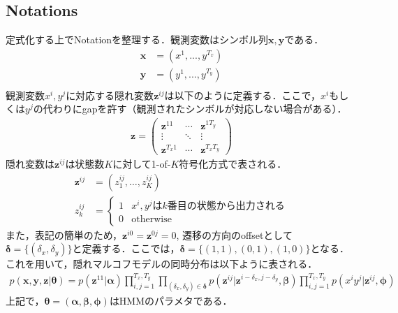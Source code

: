\subsection{Notations}
\label{subsec:phmm_nt}
定式化する上でNotationを整理する．観測変数はシンボル列$\bm{x}, \bm{y}$である．
\begin{align}
\bm{x}&=(x^1,...,y^{T_x})\\
\bm{y}&=(y^1,...,y^{T_y})\\
\end{align}
観測変数$x^i, y^j$に対応する隠れ変数$\bm{z}^{ij}$は以下のように定義する．ここで，$x^i$もしくは$y^j$の代わりにgapを許す（観測されたシンボルが対応しない場合がある）．
\begin{align}
\bm{z} = 
\begin{pmatrix}
\bm{z}^{11}  & \cdots & \bm{z}^{1 T_y} \\
\vdots  & \ddots & \vdots \\
\bm{z}^{T_x 1}& \cdots & \bm{z}^{T_x T_y}
\end{pmatrix}
\end{align}
隠れ変数は$\bm{z}^{ij}$は状態数$K$に対して1-of-$K$符号化方式で表される．
\begin{align}
\bm{z}^{ij} &= (z^{ij}_1,\ldots,z_K^{ij})\\
z_k^{ij} &= \left\{
\begin{array}{ll}
1 & \mbox{$x^i, y^j$は$k$番目の状態から出力される}\\
0 & \mbox{otherwise}
\end{array}
\right.
\end{align}
また，表記の簡単のため，$\bm{z}^{i0}=\bm{z}^{0j}=0$, 遷移の方向のoffsetとして$\bm{\delta}=\{(\delta_x, \delta_y)\}$と定義する．ここでは，$\bm{\delta}=\{(1,1),(0,1),(1,0)\}$となる．
これを用いて，隠れマルコフモデルの同時分布は以下ように表される．
\begin{align}
  p(\bm{x},\bm{y}, \bm{z}|\bm{\theta})=
p(\bm{z}^{11}|\bm{\alpha})
\prod^{T_x,T_y}_{i,j=1} \prod_{(\delta_x, \delta_y) \in \bm{\delta}}
 p(\bm{z}^{ij}|\bm{z}^{i-\delta_x, j-\delta_y}, \bm{\beta})
\prod^{T_x,T_y}_{i,j=1}
  p(x^i y^j|\bm{z}^{ij}, \bm{\phi})
\end{align}
上記で，$\bm{\theta}=(\bm{\alpha},\bm{\beta},\bm{\phi})$はHMMのパラメタである．
